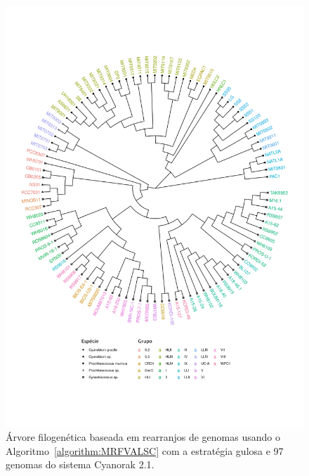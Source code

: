 \begin{figure}[!htb]
    \centering
    \includegraphics[width=.95\textwidth]{figures/REHDYXMS}
    \caption{Árvore filogenética baseada em rearranjos de genomas usando o Algoritmo~\ref{algorithm:MRFVALSC} com a estratégia gulosa e 97 genomas do sistema Cyanorak 2.1.} 
    \label{figure:REHDYXMS}
\end{figure}